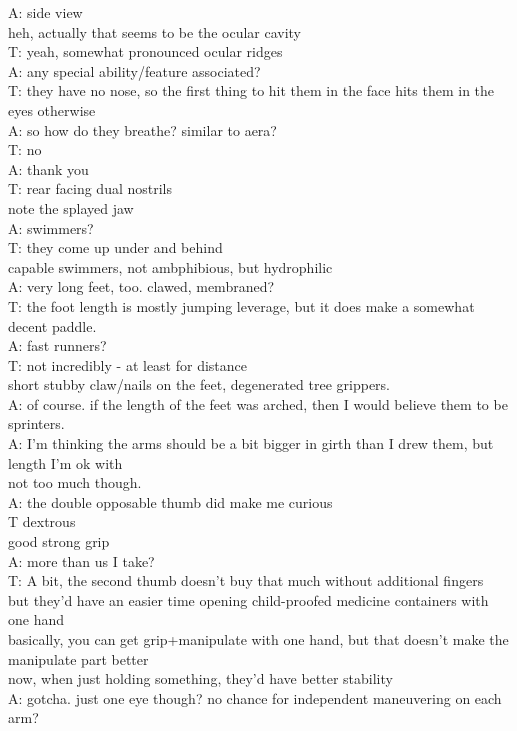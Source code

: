 A: side view\\
heh, actually that seems to be the ocular cavity\\
T: yeah, somewhat pronounced ocular ridges\\
A: any special ability/feature associated?\\
T: they have no nose, so the first thing to hit them in the face hits them in the eyes otherwise\\
A: so how do they breathe? similar to aera?\\
T: no\\
A: thank you\\
T: rear facing dual nostrils\\
note the splayed jaw\\
A: swimmers?\\
T: they come up under and behind\\
capable swimmers, not ambphibious, but hydrophilic\\
A: very long feet, too. clawed, membraned?\\
T: the foot length is mostly jumping leverage, but it does make a somewhat decent paddle.\\
A: fast runners?\\
T: not incredibly - at least for distance\\
short stubby claw/nails on the feet, degenerated tree grippers.\\
A: of course. if the length of the feet was arched, then I would believe them to be sprinters.\\
A: I'm thinking the arms should be a bit bigger in girth than I drew them, but length I'm ok with\\
not too much though.\\
A: the double opposable thumb did make me curious\\
T dextrous\\
good strong grip\\
A: more than us I take?\\
T: A bit, the second thumb doesn't buy that much without additional fingers\\
but they'd have an easier time opening child-proofed medicine containers with one hand\\
basically, you can get grip+manipulate with one hand, but that doesn't make the manipulate part better\\
now, when just holding something, they'd have better stability\\
A: gotcha. just one eye though? no chance for independent maneuvering on each arm?\\
